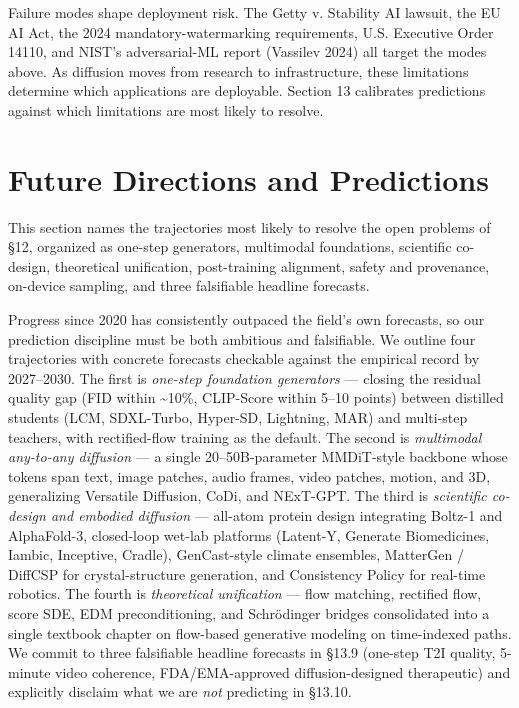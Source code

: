 Failure modes shape deployment risk. The Getty v. Stability AI lawsuit, the EU AI Act, the 2024 mandatory-watermarking requirements, U.S. Executive Order 14110, and NIST's adversarial-ML report (Vassilev 2024) all target the modes above. As diffusion moves from research to infrastructure, these limitations determine which applications are deployable. Section 13 calibrates predictions against which limitations are most likely to resolve.

\section{Future Directions and Predictions}\label{future-directions-and-predictions}

This section names the trajectories most likely to resolve the open problems of §12, organized as one-step generators, multimodal foundations, scientific co-design, theoretical unification, post-training alignment, safety and provenance, on-device sampling, and three falsifiable headline forecasts.

Progress since 2020 has consistently outpaced the field's own forecasts, so our prediction discipline must be both ambitious and falsifiable. We outline four trajectories with concrete forecasts checkable against the empirical record by 2027--2030. The first is \emph{one-step foundation generators} --- closing the residual quality gap (FID within \textasciitilde10\%, CLIP-Score within 5--10 points) between distilled students (LCM, SDXL-Turbo, Hyper-SD, Lightning, MAR) and multi-step teachers, with rectified-flow training as the default. The second is \emph{multimodal any-to-any diffusion} --- a single 20--50B-parameter MMDiT-style backbone whose tokens span text, image patches, audio frames, video patches, motion, and 3D, generalizing Versatile Diffusion, CoDi, and NExT-GPT. The third is \emph{scientific co-design and embodied diffusion} --- all-atom protein design integrating Boltz-1 and AlphaFold-3, closed-loop wet-lab platforms (Latent-Y, Generate Biomedicines, Iambic, Inceptive, Cradle), GenCast-style climate ensembles, MatterGen / DiffCSP for crystal-structure generation, and Consistency Policy for real-time robotics. The fourth is \emph{theoretical unification} --- flow matching, rectified flow, score SDE, EDM preconditioning, and Schrödinger bridges consolidated into a single textbook chapter on flow-based generative modeling on time-indexed paths. We commit to three falsifiable headline forecasts in §13.9 (one-step T2I quality, 5-minute video coherence, FDA/EMA-approved diffusion-designed therapeutic) and explicitly disclaim what we are \emph{not} predicting in §13.10.

